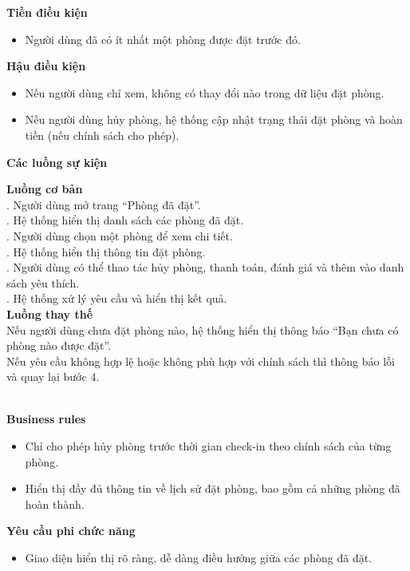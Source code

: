 \textbf{Tiền điều kiện}
\begin{itemize}
    \item Người dùng đã có ít nhất một phòng được đặt trước đó.
\end{itemize}

\textbf{Hậu điều kiện}
\begin{itemize}
    \item Nếu người dùng chỉ xem, không có thay đổi nào trong dữ liệu đặt phòng.
    \item Nếu người dùng hủy phòng, hệ thống cập nhật trạng thái đặt phòng và hoàn tiền (nếu chính sách cho phép).
\end{itemize}

\textbf{Các luồng sự kiện}

\begin{small}
\textbf{Luồng cơ bản}\\
. Người dùng mở trang “Phòng đã đặt”.\\
. Hệ thống hiển thị danh sách các phòng đã đặt.\\
. Người dùng chọn một phòng để xem chi tiết.\\
. Hệ thống hiển thị thông tin đặt phòng.\\
. Người dùng có thể thao tác hủy phòng, thanh toán, đánh giá và thêm vào danh sách yêu thích.\\
. Hệ thống xử lý yêu cầu và hiển thị kết quả.\\

\textbf{Luồng thay thế}\\
 Nếu người dùng chưa đặt phòng nào, hệ thống hiển thị thông báo “Bạn chưa có phòng nào được đặt”.\\
 Nếu yêu cầu không hợp lệ hoặc không phù hợp với chính sách thì thông báo lỗi và quay lại bước 4.\\
\end{small}\\
\textbf{\indent Business rules}
\begin{itemize}
    \item Chỉ cho phép hủy phòng trước thời gian check-in theo chính sách của từng phòng.
    \item Hiển thị đầy đủ thông tin về lịch sử đặt phòng, bao gồm cả những phòng đã hoàn thành.
\end{itemize}

\textbf{Yêu cầu phi chức năng}
\begin{itemize}
    \item Giao diện hiển thị rõ ràng, dễ dàng điều hướng giữa các phòng đã đặt.
\end{itemize}

